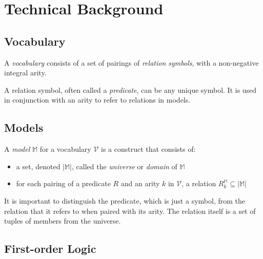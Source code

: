 \section{Technical Background}

	\subsection{Vocabulary}

		A \emph{vocabulary} consists of a set of pairings of \emph{relation
		symbols}, with a non-negative integral arity.

		A relation symbol, often called a \emph{predicate}, can be any unique
		symbol. It is used in conjunction with an arity to refer to relations
		in models.

	\subsection{Models}

		A \emph{model} $\mathbb{M}$ for a vocabulary $\mathcal{V}$ is a construct that consists of:
		\begin{itemize}
		\item a set, denoted $|\mathbb{M}|$, called the \emph{universe} or \emph{domain} of $\mathbb{M}$
		\item for each pairing of a predicate $R$ and an arity $k$ in $\mathcal{V}$, a relation $R^\mathbb{M}_k \subseteq |\mathbb{M}|$
		\end{itemize}
		It is important to distinguish the predicate, which is just a symbol,
		from the relation that it refers to when paired with its arity. The
		relation itself is a set of tuples of members from the universe.

	\subsection{First-order Logic}

